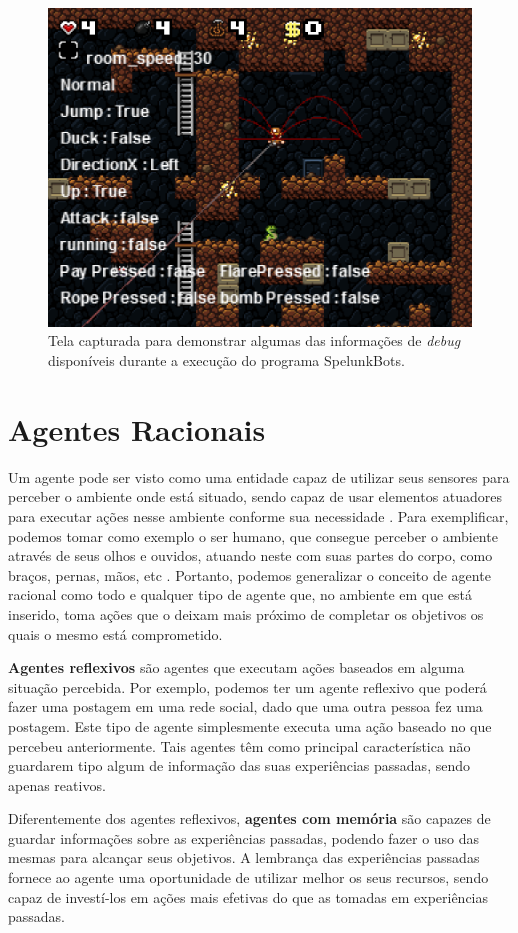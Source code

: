 \begin{figure}[htb!]
\centering\includegraphics[width=.65\textwidth]{fig/spelunkbots-debug-screen.png}
\caption {\label{fig:spelunkbots-debug-screen}Tela capturada para demonstrar
algumas das informações de \textit{debug} disponíveis durante a execução do
programa SpelunkBots.} \end{figure}


\section{\label{section:agents}Agentes Racionais}
Um agente pode ser visto como uma entidade capaz de utilizar seus sensores para
perceber o ambiente onde está situado, sendo capaz de usar elementos atuadores
para executar ações nesse ambiente conforme sua necessidade
\cite{Russell:1995:AIM:193191}. Para exemplificar, podemos tomar como exemplo o
ser humano, que consegue perceber o ambiente através de seus olhos e ouvidos,
atuando neste com suas partes do corpo, como braços, pernas, mãos, etc
\cite{Russell:1995:AIM:193191}. Portanto, podemos generalizar o conceito de
agente racional como todo e qualquer tipo de agente que, no ambiente em que
está inserido, toma ações que o deixam mais próximo de completar os objetivos
os quais o mesmo está comprometido.

\textbf{Agentes reflexivos} são agentes que executam ações baseados em alguma
situação percebida. Por exemplo, podemos ter um agente reflexivo que poderá
fazer uma postagem em uma rede social, dado que uma outra pessoa fez uma
postagem. Este tipo de agente simplesmente executa uma ação baseado no que
percebeu anteriormente. Tais agentes têm como principal característica não
guardarem tipo algum de informação das suas experiências passadas, sendo apenas
reativos.

Diferentemente dos agentes reflexivos, \textbf{agentes com memória} são capazes
de guardar informações sobre as experiências passadas, podendo fazer o uso das
mesmas para alcançar seus objetivos. A lembrança das experiências passadas
fornece ao agente uma oportunidade de utilizar melhor os seus recursos, sendo
capaz de investí-los em ações mais efetivas do que as tomadas em experiências
passadas.


